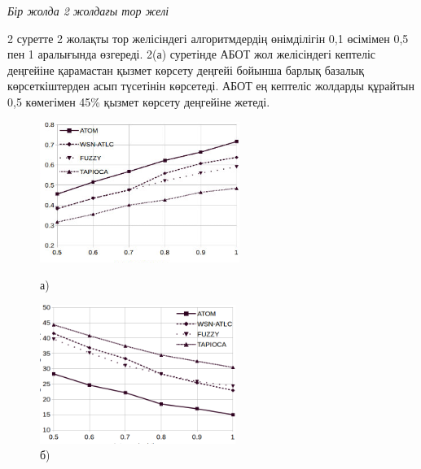 \emph{Бір жолда 2 жолдағы тор желі}

2 суретте 2 жолақты тор желісіндегі алгоритмдердің өнімділігін 0,1
өсімімен 0,5 пен 1 \hspace{0pt}\hspace{0pt}аралығында өзгереді. 2(а)
суретінде АБОТ жол желісіндегі кептеліс деңгейіне қарамастан қызмет
көрсету деңгейі бойынша барлық базалық көрсеткіштерден асып түсетінін
көрсетеді. АБОТ ең кептеліс жолдарды құрайтын 0,5 көмегімен 45\% қызмет
көрсету деңгейіне жетеді.


\begin{figure}[H]
    \centering
    \begin{minipage}{0.45\textwidth}
        \centering
        \includegraphics[width=\textwidth]{assets/159}
        \caption*{а)}
    \end{minipage}
    \hfill
    \begin{minipage}{0.45\textwidth}
        \centering
        \includegraphics[width=\textwidth]{assets/160}
        \caption*{б)}
    \end{minipage}
    

\end{figure}
